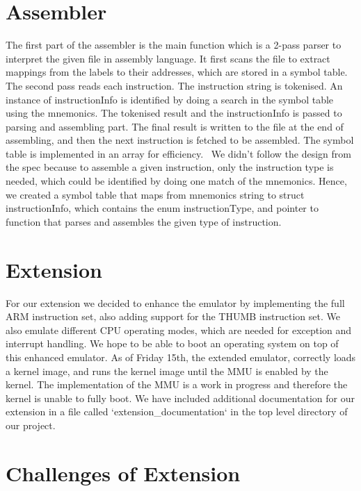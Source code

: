 \documentclass{article}
\begin{document}
\section{Assembler}
The first part of the assembler is the main function which is a 2-pass parser to interpret the given file in assembly language. It first scans the file to extract mappings from the labels to their addresses, which are stored in a symbol table. The second pass reads each instruction. The instruction string is tokenised. An instance of instructionInfo is identified by doing a search in the symbol table using the mnemonics. The tokenised result and the instructionInfo is passed to parsing and assembling part. The final result is written to the file at the end of assembling, and then the next instruction is fetched to be assembled.\newline
The symbol table is implemented in an array for efficiency. \
We didn't follow the design from the spec because to assemble a given instruction, only the instruction type is needed, which could be identified by doing one match of the mnemonics. Hence, we created a symbol table that maps from mnemonics string to struct instructionInfo, which contains the enum instructionType, and pointer to function that parses and assembles the given type of instruction.


\section{Extension}

For our extension we decided to enhance the emulator by implementing the full ARM instruction set, also adding support for the THUMB instruction set. We also emulate different CPU operating modes, which are needed for exception and interrupt handling. We hope to be able to boot an operating system on top of this enhanced emulator. As of Friday 15th, the extended emulator, correctly loads a kernel image, and runs the kernel image until the MMU is enabled by the kernel. The implementation of the MMU is a work in progress and therefore the kernel is unable to fully boot. We have included additional documentation for our extension in a file called `extension\_documentation` in the top level directory of our project.

\section{Challenges of Extension}
\end{document}
